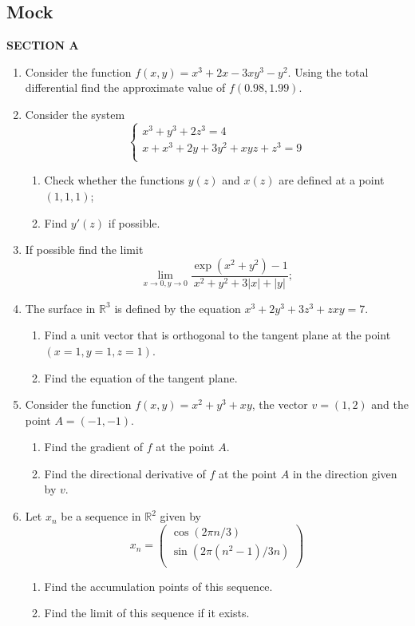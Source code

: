 \subsection{Mock}

\textbf{SECTION A}

\begin{enumerate}

\item Consider the function $f(x,y)=x^3+2x-3xy^3-y^2$. Using the total differential find the approximate value of $f(0.98,1.99)$.

\item Consider the system
\[
\begin{cases}
x^3 + y^3 + 2z^3 = 4 \\
x + x^3 + 2y + 3y^2 + xyz + z^3 = 9 \\
\end{cases}
\]
\begin{enumerate}
  \item Check whether the functions $y(z)$ and $x(z)$ are defined at a point $(1, 1, 1)$;
  \item Find $y'(z)$ if possible.
\end{enumerate}

\item If possible find the limit
\[
	\lim_{x\to 0, y\to 0} \frac{\exp(x^2 + y^2)-1}{x^2+y^2+3|x|+|y|};
\]

\item The surface in $\mathbb{R}^3$ is defined by the equation $x^3 + 2y^3 + 3z^3 + zxy = 7$.
\begin{enumerate}
  \item Find a unit vector that is orthogonal to the tangent plane at the point $(x=1, y=1, z=1)$.
  \item Find the equation of the tangent plane.
\end{enumerate}

\item Consider the function $f(x,y)=x^2 + y^3 + xy$, the vector $v=(1,2)$ and the point $A=(-1,-1)$.
\begin{enumerate}
	\item Find the gradient of $f$ at the point $A$.
	\item Find the directional derivative of $f$ at the point $A$ in the direction given by $v$.
\end{enumerate}

\item Let $x_n$ be a sequence in $\mathbb{R}^2$ given by
\[
	x_n = \begin{pmatrix}
		\cos\left( 2\pi n /3  \right) \\
		\sin\left( 2\pi (n^2-1) /3n \right) \\
	\end{pmatrix}
\]

\begin{enumerate}
	\item Find the accumulation points of this sequence.
	\item Find the limit of this sequence if it exists.
\end{enumerate}



\end{enumerate}

